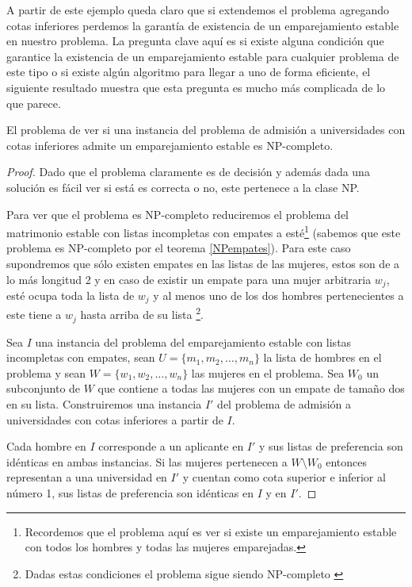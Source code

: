 A partir de este ejemplo queda claro que si extendemos el problema agregando cotas inferiores perdemos la garantía de existencia de un emparejamiento estable en nuestro problema. La pregunta clave aquí es si existe alguna condición que garantice la existencia de un emparejamiento estable para cualquier problema de este tipo o si existe algún algoritmo para llegar a uno de forma eficiente, el siguiente resultado muestra que esta pregunta es mucho más complicada de lo que parece. 

\begin{teo} \cite{Todo}
\label{np1}
El problema de ver si una instancia del problema de admisión a universidades con cotas inferiores admite un emparejamiento estable es NP-completo. 
\end{teo}

\begin{proof}
Dado que el problema claramente es de decisión y además dada una solución es fácil ver si está es correcta o no, este pertenece a la clase NP.

Para ver que el problema es NP-completo reduciremos el problema del matrimonio estable con listas incompletas con empates a esté\footnote{Recordemos que el problema aquí es ver si existe un emparejamiento estable con todos los hombres y todas las mujeres emparejadas.} (sabemos que este problema es NP-completo por el teorema \ref{NPempates}). Para este caso supondremos que sólo existen empates en las listas de las mujeres, estos son de a lo más longitud 2 y en caso de existir un empate para una mujer arbitraria $w_j$, esté ocupa toda la lista de $w_j$ y al menos uno de los dos hombres pertenecientes a este tiene a $w_j$ hasta arriba de su lista \footnote{Dadas estas condiciones el problema sigue siendo NP-completo \cite{empates}}. 

Sea $I$ una instancia del problema del emparejamiento estable con listas incompletas con empates, sean $U=\{m_1,m_2,\dots,m_n\}$ la lista de hombres en el problema y sean $W=\{w_1,w_2,\dots,w_n\}$ las mujeres en el problema. Sea $W_0$ un subconjunto de $W$ que contiene a todas las mujeres con un empate de tamaño dos en su lista. Construiremos una instancia $I'$ del problema de admisión a universidades con cotas inferiores a partir de $I$. 

Cada hombre en $I$ corresponde a un aplicante en $I'$ y sus listas de preferencia son idénticas en ambas instancias. Si las mujeres pertenecen a $W \setminus W_0$ entonces representan a una universidad en $I'$ y cuentan como cota superior e inferior al número 1, sus listas de preferencia son idénticas en $I$ y en $I'$.


\end{proof}
